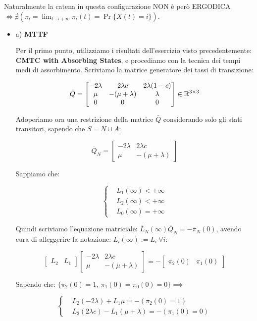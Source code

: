  Naturalmente la catena in questa configurazione NON è però ERGODICA $\iff\nexists (\pi_i = \lim_{t\to +\infty}{\pi_i(t) = \Pr\{X(t)=i\}})$.

\begin{itemize}

\item{a)} \textbf{MTTF}

Per il primo punto, utilizziamo i risultati dell'esercizio visto precedentemente: \textbf{CMTC with Absorbing States}, e procediamo con la tecnica dei tempi medi di assorbimento. Scriviamo la matrice generatore dei tassi di transizione:

\[
	\bar{Q} =
	\begin{bmatrix}-2\lambda&2\lambda c&2\lambda(1-c)\\ \mu&-(\mu+\lambda)&\lambda\\0&0&0\end{bmatrix} \in\mathbb{R}^{3\times 3}
\]

Adoperiamo ora una restrizione della matrice $\bar{Q}$ considerando solo gli stati transitori, sapendo che $S = N \cup A$:

\[
	\bar{Q}_N =
	\begin{bmatrix}-2\lambda&2\lambda c\\ \mu&-(\mu+\lambda)\end{bmatrix}
\]

Sappiamo che:

\[
	\left\{
	\begin{aligned}
	&L_1(\infty) < +\infty\\
	&L_2(\infty) < +\infty\\
	&L_0(\infty) = +\infty
	\end{aligned}
	\right.
\]

Quindi scriviamo l'equazione matriciale: $\bar{L}_N(\infty)\bar{Q}_N = -\bar{\pi}_N(0)$, avendo cura di alleggerire la notazione: $L_i(\infty) := L_i\ \forall i$:

\[
	\begin{bmatrix}L_2&L_1\end{bmatrix}\begin{bmatrix}-2\lambda&2\lambda c\\ \mu&-(\mu+\lambda)\end{bmatrix} = -\begin{bmatrix}\pi_2(0)&\pi_1(0)\end{bmatrix}
\]

Sapendo che: $\{\pi_2(0)=1,\ \pi_1(0)=\pi_0(0)=0\} \implies$

\[
	\left\{
	\begin{aligned}
	&L_2(-2\lambda)+L_1\mu = -(\pi_2(0)=1)\\
	&L_2(2\lambda c)-L_1(\mu+\lambda) = -(\pi_1(0)=0)
	\end{aligned}
	\right.
\]


\end{itemize}
